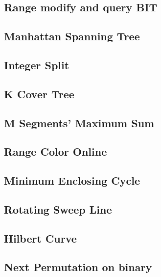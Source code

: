 \documentclass[a4paper,10pt,twocolumn,oneside]{article}
\begin{document}
\subsection{Range modify and query BIT}


\subsection{Manhattan Spanning Tree}


\subsection{Integer Split}


\subsection{K Cover Tree}


\subsection{M Segments' Maximum Sum}


%

\subsection{Range Color Online}


\subsection{Minimum Enclosing Cycle}


\subsection{Rotating Sweep Line}


\subsection{Hilbert Curve}


\subsection{Next Permutation on binary}

\end{document}
